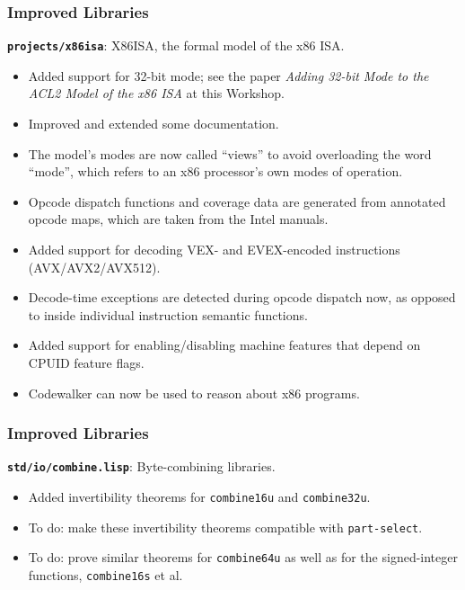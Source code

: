 \documentclass{beamer}
\newcommand{\code}[1]{\texttt{#1}}
\newcommand{\bookpath}[1]{\textbf{\code{#1}}}
\newcommand{\implibtitle}{\frametitle{Improved Libraries}}
\begin{document}
\begin{frame}

\implibtitle

{\small %
\bookpath{projects/x86isa}:
X86ISA, the formal model of the x86 ISA.
\begin{itemize}
\item
Added support for 32-bit mode; see the paper
\textit{Adding 32-bit Mode to the ACL2 Model of the x86 ISA}
at this Workshop.
\item
Improved and extended some documentation.
\item
The model's modes are now called ``views'' to avoid overloading the
word ``mode'', which refers to an x86 processor's own modes of
operation.
\item
Opcode dispatch functions and coverage data are generated from
annotated opcode maps, which are taken from the Intel manuals.
\item
Added support for decoding VEX- and EVEX-encoded instructions
(AVX/AVX2/AVX512).
\item
Decode-time exceptions are detected during opcode dispatch now, as
opposed to inside individual instruction semantic functions.
\item
Added support for enabling/disabling machine features that depend on
CPUID feature flags.
\item
Codewalker can now be used to reason about x86 programs.
\end{itemize}
}

\end{frame}


\begin{frame}

\implibtitle

\bookpath{std/io/combine.lisp}:
Byte-combining libraries.
\begin{itemize}
\item
Added invertibility theorems for \code{combine16u} and \code{combine32u}.
\item
To do: make these invertibility theorems compatible with \code{part-select}.
\item
To do: prove similar theorems for \code{combine64u} as well as for the
signed-integer functions, \code{combine16s} et al.
\end{itemize}

\end{frame}
\end{document}
